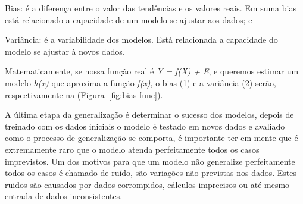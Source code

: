 \begin{alineas}
	\item Bias: é a diferença entre o valor das tendências e os valores reais. Em suma bias está relacionado a capacidade de um modelo
				se ajustar aos dados; e
	\item Variância: é a variabilidade dos modelos. Está relacionada a capacidade do modelo se ajustar à novos dados.  
\end{alineas}   

Matematicamente, se nossa função real é \textit{Y = f(X) + E}, e queremos estimar um modelo \textit{h(x)} que aproxima a função \textit{f(x)},
o bias (1) e a variância (2) serão, respectivamente na (Figura~\ref{fig:bias-func}).

\begin{figure}[ht!]
	\centering
\end{figure}

A última etapa da generalização é determinar o sucesso dos modelos, depois de treinado com os dados iniciais
o modelo é testado em novos dados e avaliado como o processo de generalização se comporta, é importante ter em mente que é extremamente raro
que o modelo atenda perfeitamente todos os casos imprevistos.
Um dos motivos para que um modelo não generalize perfeitamente todos os casos é chamado de ruído, são variações não previstas nos dados.
Estes ruidos são causados por dados corrompidos, cálculos imprecisos ou até mesmo entrada de dados inconsistentes.









 